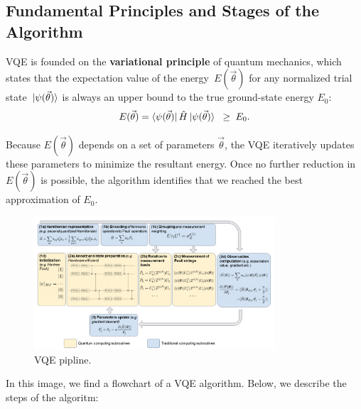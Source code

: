 \subsection{Fundamental Principles and Stages of the Algorithm}
\label{subsec:vqe_principles_stages}

VQE is founded on the \textbf{variational principle} of quantum mechanics, which states that the expectation value of the energy 
\(\,E(\vec{\theta})\)
for any normalized trial state \(\,\ket{\psi(\vec{\theta})}\) is always an upper bound to the true ground-state energy \(E_0\):
\[
E(\vec{\theta}) 
= \bra{\psi(\vec{\theta})} \hat{H} \ket{\psi(\vec{\theta})}
\;\;\geq\; E_0.
\]

Because \(E(\vec{\theta})\) depends on a set of parameters \(\vec{\theta}\), the VQE iteratively updates these parameters to minimize the resultant energy. Once no further reduction in \(E(\vec{\theta})\) is possible, the algorithm identifies that we reached the best approximation of \(E_0\).
\begin{figure}[H]
    \centering
    \includegraphics[width=0.8\textwidth]{img/VQE_flowchart.png}
    \caption{VQE pipline\cite{VQE_review}.}
    \label{fig:vqe_flowchart}
\end{figure}

In this image, we find a flowchart of a VQE algorithm. Below, we describe the steps of the algoritm:


